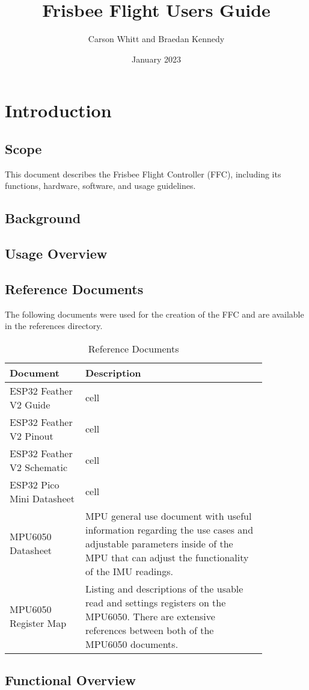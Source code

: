 \documentclass[12pt, letterpaper]{article}
\title{Frisbee Flight Users Guide}
\author{Carson Whitt and Braedan Kennedy}
\date{January 2023}
\newcommand{\ra}[1]{\renewcommand{\arraystretch}{#1}}
\begin{document}
\maketitle
\tableofcontents
\newpage

\section{Introduction}\label{section:intro}

\subsection{Scope}
This document describes the Frisbee Flight Controller (FFC), including its functions, hardware,
software, and usage guidelines.

\subsection{Background}

\subsection{Usage Overview}

\subsection{Reference Documents}
The following documents were used for the creation of the FFC and are available in the references
directory.
\begin{table}[ht]
    \centering
    \footnotesize
    \ra{1.3}
    \caption{Reference Documents}
    \begin{tabular}{p{0.25 \linewidth} p{0.6 \linewidth}}
        \toprule
        \textbf{Document} & \textbf{Description}\\
        \midrule
        ESP32 Feather V2 Guide & cell\\
        \cmidrule(lr){1-2}
        ESP32 Feather V2 Pinout & cell\\
        \cmidrule(lr){1-2}
        ESP32 Feather V2 Schematic & cell\\
        \cmidrule(lr){1-2}
        ESP32 Pico Mini Datasheet &cell\\
        \cmidrule(lr){1-2}
        MPU6050 Datasheet & MPU general use document with useful information regarding the use cases
        and adjustable parameters inside of the MPU that can adjust the functionality of the IMU
        readings.\\
        \cmidrule(lr){1-2}
        MPU6050 Register Map & Listing and descriptions of the usable read and settings registers on
        the MPU6050. There are extensive references between both of the MPU6050 documents.\\
        \bottomrule
    \end{tabular}
\end{table}

\subsection{Functional Overview}
\end{document}
